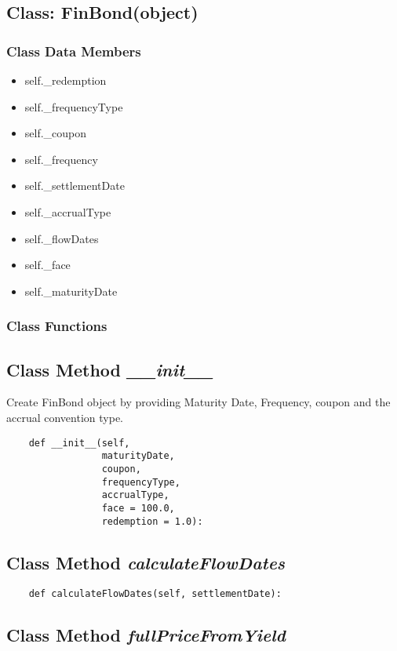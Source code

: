 \documentclass[twoside,11pt]{book}
\begin{document}
\subsection{Class: FinBond(object)}


\subsubsection{Class Data Members}
\begin{itemize}
\item{self.\_redemption}
\item{self.\_frequencyType}
\item{self.\_coupon}
\item{self.\_frequency}
\item{self.\_settlementDate}
\item{self.\_accrualType}
\item{self.\_flowDates}
\item{self.\_face}
\item{self.\_maturityDate}
\end{itemize}

\subsubsection{Class Functions}

\subsection{Class Method {\it \_\_init\_\_}}
Create FinBond object by providing Maturity Date, Frequency, coupon and the accrual convention type. 

\begin{lstlisting}
    def __init__(self, 
                 maturityDate, 
                 coupon, 
                 frequencyType, 
                 accrualType,
                 face = 100.0,
                 redemption = 1.0):
\end{lstlisting}

\subsection{Class Method {\it calculateFlowDates}}


\begin{lstlisting}
    def calculateFlowDates(self, settlementDate):
\end{lstlisting}

\subsection{Class Method {\it fullPriceFromYield}}
\end{document}
